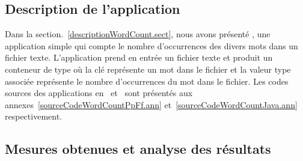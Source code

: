 




\subsection{Description de l'application}

Dans la section.~\ref{descriptionWordCount.sect}, nous avons pr\'esent\'e , une application simple qui compte le nombre d'occurrences des divers mots dans un fichier texte. L'application prend en entr\'ee un fichier texte et produit un conteneur de type  où la cl\'e repr\'esente un mot dans le fichier et la valeur  type   associ\'ee repr\'esente le nombre d'occurrences du mot dans le fichier. Les codes sources des applications  en~ et~ sont pr\'esent\'es aux annexes~\ref{sourceCodeWordCountPpFf.ann} et~\ref{sourceCodeWordCountJava.ann} respectivement.


\subsection{Mesures obtenues et analyse des r\'esultats}




%
% 


